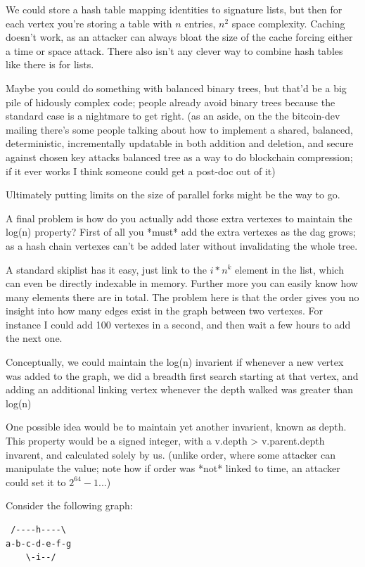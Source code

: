\documentclass{article}
\begin{document}
We could store a hash table mapping identities to signature lists, but
then for each vertex you're storing a table with $n$ entries, $n^2$ space
complexity. Caching doesn't work, as an attacker can always bloat the
size of the cache forcing either a time or space attack. There also
isn't any clever way to combine hash tables like there is for lists.

Maybe you could do something with balanced binary trees, but that'd be a
big pile of hidously complex code; people already avoid binary trees
because the standard case is a nightmare to get right. (as an aside, on
the the bitcoin-dev mailing there's some people talking about how to
implement a shared, balanced, deterministic, incrementally updatable in
both addition and deletion, and secure against chosen key attacks
balanced tree as a way to do blockchain compression; if it ever works I
think someone could get a post-doc out of it)

Ultimately putting limits on the size of parallel forks might be the way
to go.


A final problem is how do you actually add those extra vertexes to
maintain the log(n) property? First of all you *must* add the extra
vertexes as the dag grows; as a hash chain vertexes can't be added later
without invalidating the whole tree. 

A standard skiplist has it easy, just link to the $i*n^k$ element in the
list, which can even be directly indexable in memory. Further more you
can easily know how many elements there are in total. The problem here
is that the order gives you no insight into how many edges exist in the
graph between two vertexes. For instance I could add 100 vertexes in a
second, and then wait a few hours to add the next one.

Conceptually, we could maintain the log(n) invarient if whenever a new
vertex was added to the graph, we did a breadth first search starting at
that vertex, and adding an additional linking vertex whenever the depth
walked was greater than log(n)


One possible idea would be to maintain yet another invarient, known as
depth. This property would be a signed integer, with a v.depth >
v.parent.depth invarent, and calculated solely by us.  (unlike order,
where some attacker can manipulate the value; note how if order was
*not* linked to time, an attacker could set it to $2^64-1$...)

Consider the following graph:

\begin{verbatim}
 /----h----\
a-b-c-d-e-f-g
    \-i--/
\end{verbatim}
\end{document}
